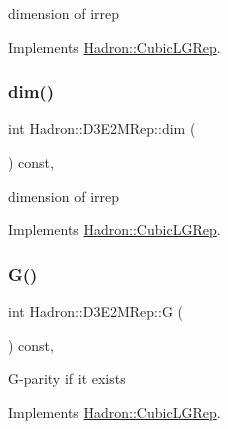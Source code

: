 dimension of irrep 

Implements \mbox{\hyperlink{structHadron_1_1CubicLGRep_a3acbaea26503ed64f20df693a48e4cdd}{Hadron\+::\+Cubic\+L\+G\+Rep}}.

\mbox{\label{structHadron_1_1D3E2MRep_a73c88cd77967138738e5b0bcdda21ab9}} 
\subsubsection{\texorpdfstring{dim()}{dim()}\hspace{0.1cm}{\footnotesize\ttfamily [3/3]}}
{\footnotesize\ttfamily int Hadron\+::\+D3\+E2\+M\+Rep\+::dim (\begin{DoxyParamCaption}{ }\end{DoxyParamCaption}) const\hspace{0.3cm}{\ttfamily [inline]}, {\ttfamily [virtual]}}

dimension of irrep 

Implements \mbox{\hyperlink{structHadron_1_1CubicLGRep_a3acbaea26503ed64f20df693a48e4cdd}{Hadron\+::\+Cubic\+L\+G\+Rep}}.

\mbox{\label{structHadron_1_1D3E2MRep_a5df809ae715e45d60cef8bc3cfb4d567}} 
\subsubsection{\texorpdfstring{G()}{G()}\hspace{0.1cm}{\footnotesize\ttfamily [1/3]}}
{\footnotesize\ttfamily int Hadron\+::\+D3\+E2\+M\+Rep\+::G (\begin{DoxyParamCaption}{ }\end{DoxyParamCaption}) const\hspace{0.3cm}{\ttfamily [inline]}, {\ttfamily [virtual]}}

G-\/parity if it exists 

Implements \mbox{\hyperlink{structHadron_1_1CubicLGRep_ace26f7b2d55e3a668a14cb9026da5231}{Hadron\+::\+Cubic\+L\+G\+Rep}}.

\mbox{\label{structHadron_1_1D3E2MRep_a5df809ae715e45d60cef8bc3cfb4d567}} 
